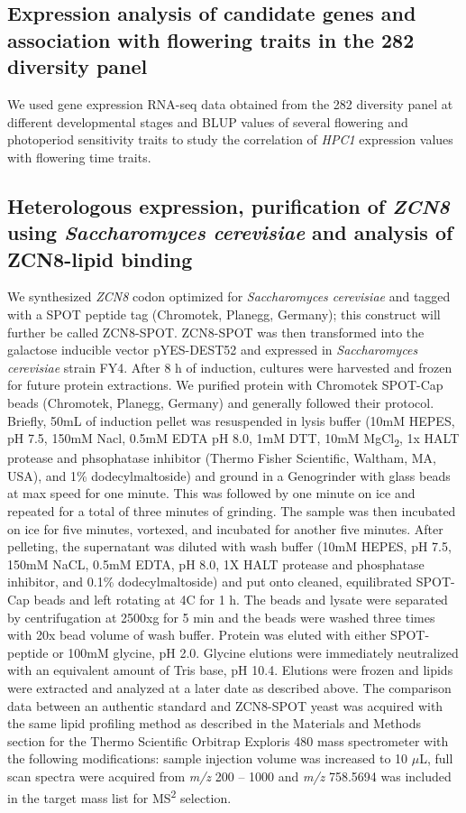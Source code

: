 \documentclass[9pt,twocolumn,twoside,lineno]{biorxiv}
\newcommand{\hpc}{\textit{HPC1}\xspace}
\begin{document}
\subsection{Expression analysis of candidate genes and association with flowering traits in the 282 diversity panel}
We used gene expression RNA-seq data obtained from the 282 diversity panel at different developmental stages \cite{Kremling2018-gn} and BLUP values of several flowering and photoperiod sensitivity traits \cite{Hung2012-ms} to study the correlation of \hpc expression values with flowering time traits.  
\subsection{Heterologous expression, purification of \textit{ZCN8} using \textit{Saccharomyces cerevisiae} and analysis of ZCN8-lipid binding}
We synthesized \textit{ZCN8} codon optimized for \textit{Saccharomyces cerevisiae} and tagged with a SPOT peptide tag (Chromotek, Planegg, Germany); this construct will further be called ZCN8-SPOT. 
ZCN8-SPOT was then transformed into the galactose inducible vector pYES-DEST52 and expressed in \textit{Saccharomyces cerevisiae} strain FY4. 
After 8 h of induction, cultures were harvested and frozen for future protein extractions. 
We purified protein with Chromotek SPOT-Cap beads (Chromotek, Planegg, Germany) and generally followed their protocol. 
Briefly, 50mL of induction pellet was resuspended in lysis buffer (10mM HEPES, pH 7.5, 150mM Nacl, 0.5mM EDTA pH 8.0, 1mM DTT, 10mM MgCl\textsubscript{2}, 1x HALT protease and phsophatase inhibitor (Thermo Fisher Scientific, Waltham, MA, USA), and 1\% dodecylmaltoside) and ground in a Genogrinder with glass beads at max speed for one minute.
This was followed by one minute on ice and repeated for a total of three minutes of grinding.
The sample was then incubated on ice for five minutes, vortexed, and incubated for another five minutes. 
After pelleting, the supernatant was diluted with wash buffer (10mM HEPES, pH 7.5, 150mM NaCL, 0.5mM EDTA, pH 8.0, 1X HALT protease and phosphatase inhibitor, and 0.1\% dodecylmaltoside) and put onto cleaned, equilibrated SPOT-Cap beads and left rotating at 4\textdegree C for 1 h.
The beads and lysate were separated by centrifugation at 2500xg for 5 min and the beads were washed three times with 20x bead volume of wash buffer. 
Protein was eluted with either SPOT-peptide or 100mM glycine, pH 2.0. 
Glycine elutions were immediately neutralized with an equivalent amount of Tris base, pH 10.4.
Elutions were frozen and lipids were extracted and analyzed at a later date as described above. 
The comparison data between an authentic standard and ZCN8-SPOT yeast was acquired with the same lipid profiling method as described in the Materials and Methods section for the Thermo Scientific Orbitrap Exploris 480 mass spectrometer with the following modifications: sample injection volume was increased to 10 $\mu$L, full scan spectra were acquired from \emph{m/z} 200 – 1000 and \emph{m/z} 758.5694 was included in the target mass list for MS\textsuperscript{2} selection.
\end{document}
